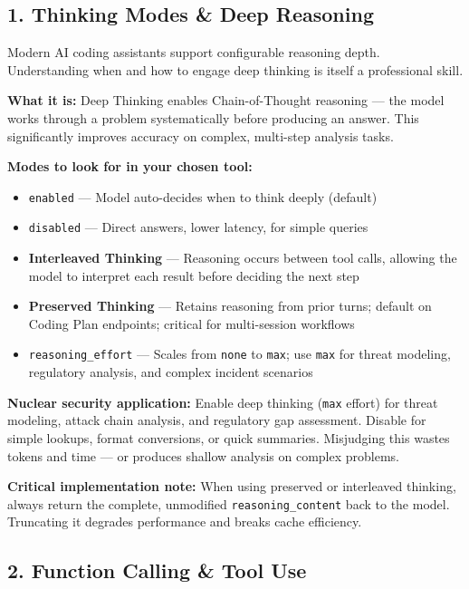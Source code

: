 \documentclass[9pt]{extarticle}
\begin{document}
\subsection*{1. Thinking Modes \& Deep Reasoning}

Modern AI coding assistants support configurable reasoning depth. Understanding
when and how to engage deep thinking is itself a professional skill.

\medskip

\textbf{What it is:} Deep Thinking enables Chain-of-Thought reasoning --- the model
works through a problem systematically before producing an answer. This
significantly improves accuracy on complex, multi-step analysis tasks.

\medskip

\textbf{Modes to look for in your chosen tool:}
\begin{itemize}
    \item \texttt{enabled} --- Model auto-decides when to think deeply (default)
    \item \texttt{disabled} --- Direct answers, lower latency, for simple queries
    \item \textbf{Interleaved Thinking} --- Reasoning occurs between tool calls,
          allowing the model to interpret each result before deciding the next step
    \item \textbf{Preserved Thinking} --- Retains reasoning from prior turns;
          default on Coding Plan endpoints; critical for multi-session workflows
    \item \texttt{reasoning\_effort} --- Scales from \texttt{none} to \texttt{max};
          use \texttt{max} for threat modeling, regulatory analysis, and complex
          incident scenarios
\end{itemize}

\textbf{Nuclear security application:} Enable deep thinking (\texttt{max} effort)
for threat modeling, attack chain analysis, and regulatory gap assessment. Disable
for simple lookups, format conversions, or quick summaries. Misjudging this
wastes tokens and time --- or produces shallow analysis on complex problems.

\medskip

\textbf{Critical implementation note:} When using preserved or interleaved
thinking, always return the complete, unmodified \texttt{reasoning\_content}
back to the model. Truncating it degrades performance and breaks cache efficiency.

\subsection*{2. Function Calling \& Tool Use}
\end{document}
